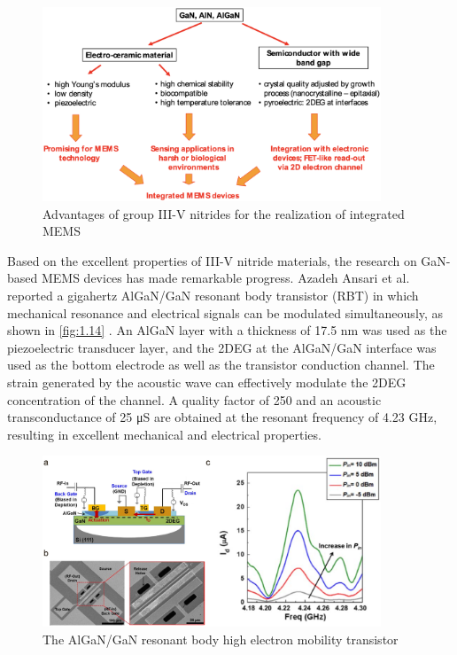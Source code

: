 \begin{figure}[H] 
\centering    
\includegraphics[width=0.9\textwidth]{ch1_13}
\caption[Advantages of group III-V nitrides for the realization of integrated MEMS]{Advantages of group III-V nitrides for the realization of integrated MEMS \protect\cite{cimalla2010algan}}
\label{fig:1.13}
\end{figure}

Based on the excellent properties of III-V nitride  materials, the research on GaN-based MEMS  devices has made remarkable progress. Azadeh Ansari et al. reported a gigahertz AlGaN/GaN resonant body transistor (RBT)  in which mechanical resonance and electrical signals can be modulated  simultaneously, as shown in \autoref{fig:1.14} \cite{ansari2014thickness}. An AlGaN layer with a thickness of 17.5 \unit{\nm} was used as the piezoelectric transducer layer, and the 2DEG  at the AlGaN/GaN interface  was used as the bottom electrode  as well as the transistor conduction  channel. The strain  generated by the acoustic wave can effectively modulate the 2DEG concentration  of the  channel. A quality factor of 250 and an acoustic transconductance  of 25 \unit{\micro\siemens} are obtained at the resonant frequency of 4.23 \unit{\GHz}, resulting in excellent mechanical and electrical properties.

\begin{figure}[H] 
\centering    
\includegraphics[width=0.9\textwidth]{ch1_14}
\caption[The AlGaN/GaN resonant body high electron mobility transistor]{The AlGaN/GaN resonant body high electron mobility transistor \protect\cite{ansari2014thickness}}
\label{fig:1.14}
\end{figure}

